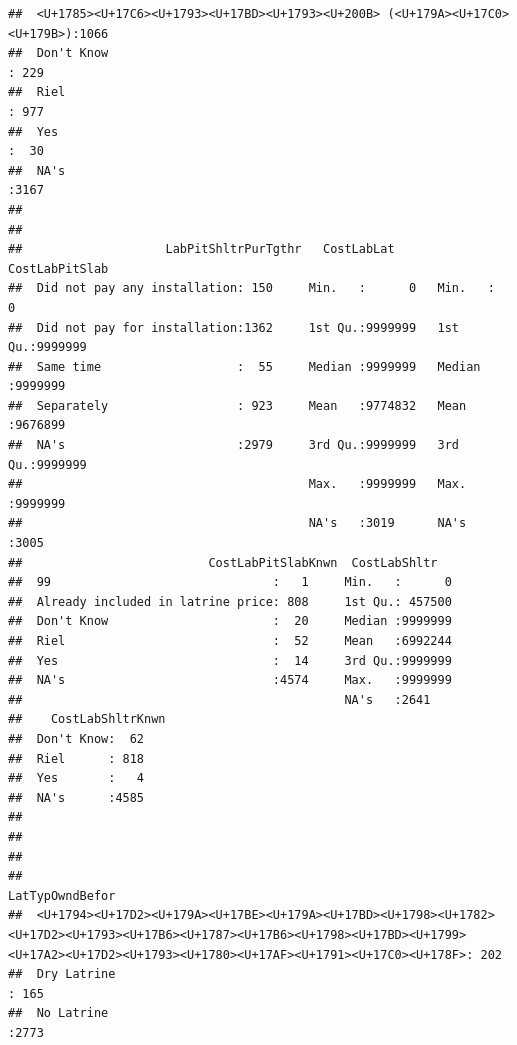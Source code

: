\documentclass[11pt,]{article}
\begin{document}
\begin{verbatim}
##  <U+1785><U+17C6><U+1793><U+17BD><U+1793><U+200B> (<U+179A><U+17C0><U+179B>):1066   
##  Don't Know                                                                 : 229   
##  Riel                                                                       : 977   
##  Yes                                                                        :  30   
##  NA's                                                                       :3167   
##                                                                                     
##                                                                                     
##                    LabPitShltrPurTgthr   CostLabLat      CostLabPitSlab   
##  Did not pay any installation: 150     Min.   :      0   Min.   :      0  
##  Did not pay for installation:1362     1st Qu.:9999999   1st Qu.:9999999  
##  Same time                   :  55     Median :9999999   Median :9999999  
##  Separately                  : 923     Mean   :9774832   Mean   :9676899  
##  NA's                        :2979     3rd Qu.:9999999   3rd Qu.:9999999  
##                                        Max.   :9999999   Max.   :9999999  
##                                        NA's   :3019      NA's   :3005     
##                          CostLabPitSlabKnwn  CostLabShltr    
##  99                               :   1     Min.   :      0  
##  Already included in latrine price: 808     1st Qu.: 457500  
##  Don't Know                       :  20     Median :9999999  
##  Riel                             :  52     Mean   :6992244  
##  Yes                              :  14     3rd Qu.:9999999  
##  NA's                             :4574     Max.   :9999999  
##                                             NA's   :2641     
##    CostLabShltrKnwn
##  Don't Know:  62   
##  Riel      : 818   
##  Yes       :   4   
##  NA's      :4585   
##                    
##                    
##                    
##                                                                                                                                                                                          LatTypOwndBefor
##  <U+1794><U+17D2><U+179A><U+17BE><U+179A><U+17BD><U+1798><U+1782><U+17D2><U+1793><U+17B6><U+1787><U+17B6><U+1798><U+17BD><U+1799><U+17A2><U+17D2><U+1793><U+1780><U+17AF><U+1791><U+17C0><U+178F>: 202  
##  Dry Latrine                                                                                                                                                                                     : 165  
##  No Latrine                                                                                                                                                                                      :2773  

\end{verbatim}
\end{document}
